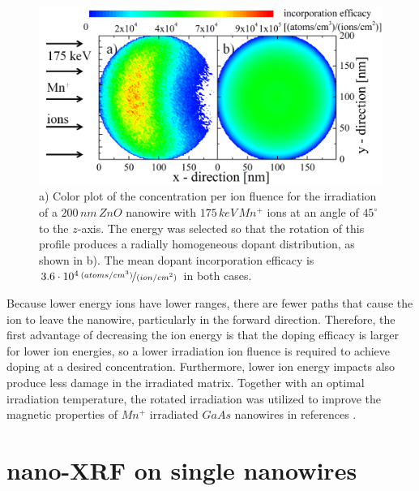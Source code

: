 \begin{figure}
	\centering
		\includegraphics[width=.8\textwidth]{images/iradinacrosssection.png}
	\caption{a) Color plot of the concentration per ion fluence for the irradiation of a $200\,nm\,ZnO$ nanowire with $175\,keV\,Mn^+$ ions at an angle of $45^\circ$ to the $z$-axis. The energy was selected so that the rotation of this profile produces a radially homogeneous dopant distribution, as shown in b). The mean dopant incorporation efficacy is $3.6\cdot10^4\,\nicefrac{(atoms/cm^3)}{(ion/cm^2)}$ in both cases.}
	\label{iradinacrossection}
\end{figure} 

Because lower energy ions have lower ranges, there are fewer paths that cause the ion to leave the nanowire, particularly in the forward direction. Therefore, the first advantage of decreasing the ion energy is that the doping efficacy is larger for lower ion energies, so a lower irradiation ion fluence is required to achieve doping at a desired concentration. Furthermore, lower ion energy impacts also produce less damage in the irradiated matrix. Together with an optimal irradiation temperature, the rotated irradiation was utilized to improve the magnetic properties of $Mn^+$ irradiated $GaAs$ nanowires in references \cite{borschel_new_2011,paschoal_hopping_2012,borschel_ion-solid_2012,kumar_magnetic_2013,paschoal_magnetoresistance_2014}. 




\section{nano-XRF on single nanowires}

